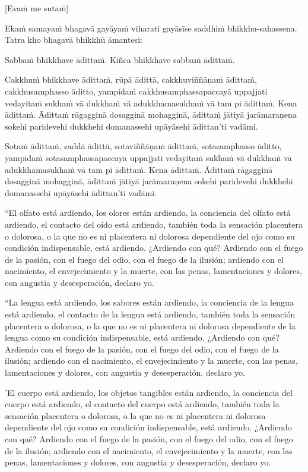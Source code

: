 [Evaṁ me sutaṁ]

Ekaṁ samayaṁ bhagavā gayāyaṁ viharati gayāsīse saddhiṁ bhikkhu-sahassena.
Tatra kho bhagavā bhikkhū āmantesi:

Sabbaṁ bhikkhave ādittaṁ. Kiñca bhikkhave sabbaṁ ādittaṁ.

Cakkhuṁ bhikkhave ādittaṁ, rūpā ādittā, cakkhuviññāṇaṁ ādittaṁ,
cakkhusamphasso āditto, yampidaṁ cakkhusamphassapaccayā uppajjati
vedayitaṁ sukhaṁ vā dukkhaṁ vā adukkhamasukhaṁ vā tam pi ādittaṁ. Kena
ādittaṁ. Ādittaṁ rāgagginā dosagginā mohagginā, ādittaṁ jātiyā
jarāmaraṇena sokehi paridevehi dukkhehi domanassehi upāyāsehi ādittan'ti
vadāmi.

Sotaṁ ādittaṁ, saddā ādittā, sotaviññāṇaṁ ādittaṁ, sotasamphasso āditto,
yampidaṁ sotasamphassapaccayā uppajjati vedayitaṁ sukhaṁ vā dukkhaṁ vā
adukkhamasukhaṁ vā tam pi ādittaṁ. Kena ādittaṁ. Ādittaṁ rāgagginā
dosagginā mohagginā, ādittaṁ jātiyā jarāmaraṇena sokehi paridevehi
dukkhehi domanassehi upāyāsehi ādittan'ti vadāmi.

\clearpage

\englishText
\markboth{\englishTitle}{\rightmark}
“El olfato está ardiendo, los olores están ardiendo, la conciencia del olfato está ardiendo, el contacto del oído está ardiendo, también toda la sensación placentera o dolorosa, o la que no es ni placentera ni dolorosa dependiente del ojo como su condición indispensable, está ardiendo. ¿Ardiendo con qué? Ardiendo con el fuego de la pasión, con el fuego del odio, con el fuego de la ilusión; ardiendo con el nacimiento, el envejecimiento y la muerte, con las penas, lamentaciones y dolores, con angustia y desesperación, declaro yo.

“La lengua está ardiendo, los sabores están ardiendo, la conciencia de la lengua está ardiendo, el contacto de la lengua está ardiendo, también toda la sensación placentera o dolorosa, o la que no es ni placentera ni dolorosa dependiente de la lengua como su condición indispensable, está ardiendo. ¿Ardiendo con qué? Ardiendo con el fuego de la pasión, con el fuego del odio, con el fuego de la ilusión; ardiendo con el nacimiento, el envejecimiento y la muerte, con las penas, lamentaciones y dolores, con angustia y desesperación, declaro yo.


'El cuerpo está ardiendo, los objetos tangibles están ardiendo, la conciencia del cuerpo está ardiendo, el contacto del cuerpo está ardiendo, también toda la sensación placentera o dolorosa, o la que no es ni placentera ni dolorosa dependiente del ojo como su condición indispensable, está ardiendo. ¿Ardiendo con qué? Ardiendo con el fuego de la pasión, con el fuego del odio, con el fuego de la ilusión; ardiendo con el nacimiento, el envejecimiento y la muerte, con las penas, lamentaciones y dolores, con angustia y desesperación, declaro yo.

